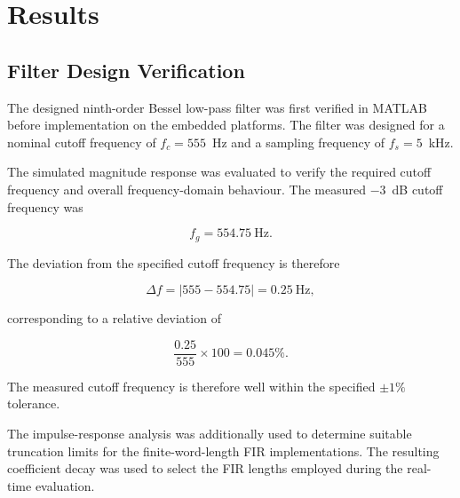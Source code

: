 
\chapter{Results}
\label{chap:results}


\section{Filter Design Verification}
\label{sec:filter_design_verification}

The designed ninth-order Bessel low-pass filter was first verified in MATLAB
before implementation on the embedded platforms. The filter was designed for a
nominal cutoff frequency of $f_c=555$~Hz and a sampling frequency of
$f_s=5$~kHz.

The simulated magnitude response was evaluated to verify the required cutoff
frequency and overall frequency-domain behaviour. The measured $-3$~dB cutoff
frequency was

\begin{equation}
    f_g = 554.75~\mathrm{Hz}.
\end{equation}

The deviation from the specified cutoff frequency is therefore

\begin{equation}
    \Delta f =
    |555-554.75|
    = 0.25~\mathrm{Hz},
\end{equation}

corresponding to a relative deviation of

\begin{equation}
    \frac{0.25}{555}\times100
    = 0.045\%.
\end{equation}

The measured cutoff frequency is therefore well within the specified $\pm1\%$
tolerance.

The impulse-response analysis was additionally used to determine suitable
truncation limits for the finite-word-length FIR implementations. The resulting
coefficient decay was used to select the FIR lengths employed during the
real-time evaluation.

